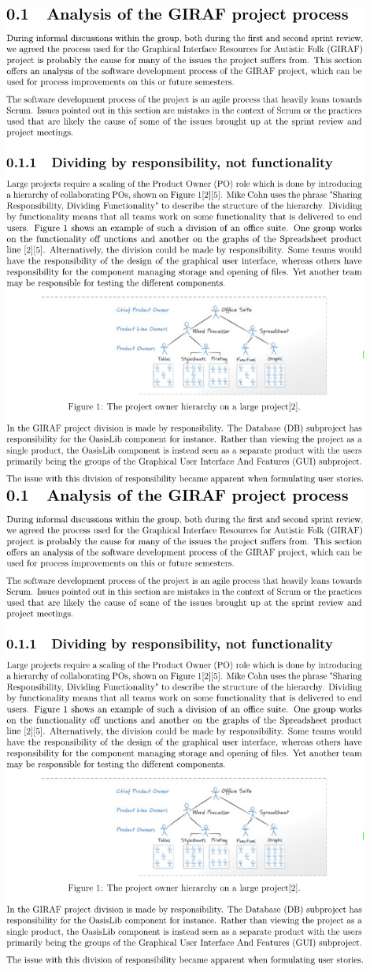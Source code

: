 \includegraphics[page=3,width=0.9\textwidth]{part_appendix/sw601f15.pdf}\newpage
\includegraphics[page=4,width=0.9\textwidth]{part_appendix/sw601f15.pdf}\newpage
